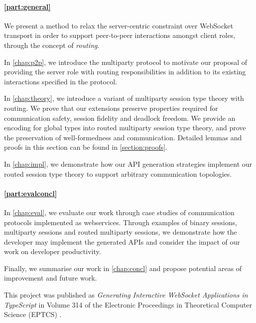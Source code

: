 \paragraph{\cref{part:general}} 
We present a method to relax the server-centric constraint over WebSocket
transport in order to support peer-to-peer interactions amongst 
client roles, through the concept of \emph{routing}.

In \cref{chap:p2p}, we introduce the  multiparty
protocol to motivate our proposal of providing the server role with 
routing responsibilities in addition to its existing interactions
specified in the protocol.

In \cref{chap:theory}, we introduce a variant of multiparty 
session type theory with routing. We prove that our extensions preserve 
properties required for communication safety, 
session fidelity and deadlock freedom.
We provide an encoding for global types into routed multiparty 
session type theory, and prove the preservation of well-formedness
and communication. Detailed lemmas and proofs in this section can
be found in \cref{section:proofs}.

In \cref{chap:impl}, we demonstrate how our API generation strategies
implement our routed session type theory to support arbitrary communication
topologies.

\paragraph{\cref{part:evalconcl}}
In \cref{chap:eval}, we evaluate our work through 
case studies of communication protocols 
implemented as webservices. Through examples of binary sessions,
multiparty sessions and routed multiparty sessions, we demonstrate how the
developer may implement the generated APIs and consider the impact of our work
on developer productivity.

Finally, we summarise our work in \cref{chap:concl} and propose potential
areas of improvement and future work.

\begin{remark}
This project was published as \emph{Generating Interactive WebSocket 
Applications in TypeScript} in Volume 314 of the Electronic Proceedings
in Theoretical Computer Science (EPTCS) \cite{PLACES2020}.
\end{remark}